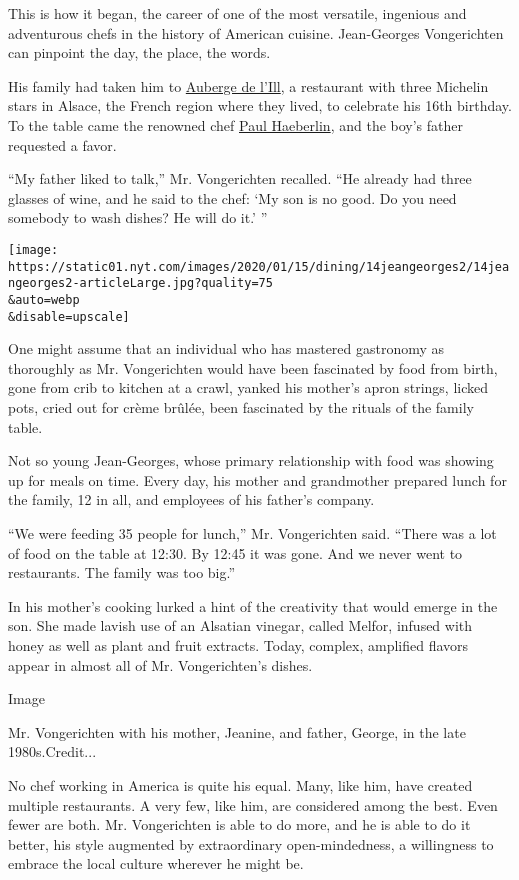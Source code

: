 This is how it began, the career of one of the most versatile, ingenious
and adventurous chefs in the history of American cuisine. Jean-Georges
Vongerichten can pinpoint the day, the place, the words.

His family had taken him to
\href{https://www.auberge-de-l-ill.com/fr/}{Auberge de l'Ill}, a
restaurant with three Michelin stars in Alsace, the French region where
they lived, to celebrate his 16th birthday. To the table came the
renowned chef
\href{https://www.nytimes.com/2008/05/13/world/europe/13haeberlin.html}{Paul
Haeberlin}, and the boy's father requested a favor.

``My father liked to talk,'' Mr. Vongerichten recalled. ``He already had
three glasses of wine, and he said to the chef: `My son is no good. Do
you need somebody to wash dishes? He will do it.' ''

\texttt{[image: https://static01.nyt.com/images/2020/01/15/dining/14jeangeorges2/14jeangeorges2-articleLarge.jpg?quality=75\\\&auto=webp\\\&disable=upscale]}

One might assume that an individual who has mastered gastronomy as
thoroughly as Mr. Vongerichten would have been fascinated by food from
birth, gone from crib to kitchen at a crawl, yanked his mother's apron
strings, licked pots, cried out for crème brûlée, been fascinated by the
rituals of the family table.

Not so young Jean-Georges, whose primary relationship with food was
showing up for meals on time. Every day, his mother and grandmother
prepared lunch for the family, 12 in all, and employees of his father's
company.

``We were feeding 35 people for lunch,'' Mr. Vongerichten said. ``There
was a lot of food on the table at 12:30. By 12:45 it was gone. And we
never went to restaurants. The family was too big.''

In his mother's cooking lurked a hint of the creativity that would
emerge in the son. She made lavish use of an Alsatian vinegar, called
Melfor, infused with honey as well as plant and fruit extracts. Today,
complex, amplified flavors appear in almost all of Mr. Vongerichten's
dishes.

Image

Mr. Vongerichten with his mother, Jeanine, and father, George, in the
late 1980s.Credit...

No chef working in America is quite his equal. Many, like him, have
created multiple restaurants. A very few, like him, are considered among
the best. Even fewer are both. Mr. Vongerichten is able to do more, and
he is able to do it better, his style augmented by extraordinary
open-mindedness, a willingness to embrace the local culture wherever he
might be.

